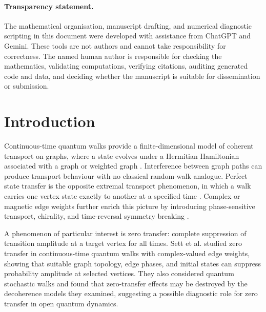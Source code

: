 \documentclass[11pt]{article}
\theoremstyle{definition}
\begin{document}
\begin{abstract}
Finally, we record finite-time perturbation bounds and a Lindblad block-preservation theorem. For open systems, exact target exclusion is preserved when the Lindblad generator leaves the supported operator block $\mathcal B_P=\{X:X=PXP\}$ invariant. The paper is a finite-dimensional formalism for exact source-target transition zeros and machine-checkable certificates; it is not a claim of intrinsic topological protection, generic robustness, physical implementation, or a new physical theory.
\end{abstract}

\paragraph{Transparency statement.}
The mathematical organisation, manuscript drafting, and numerical diagnostic scripting in this document were developed with assistance from ChatGPT and Gemini. These tools are not authors and cannot take responsibility for correctness. The named human author is responsible for checking the mathematics, validating computations, verifying citations, auditing generated code and data, and deciding whether the manuscript is suitable for dissemination or submission.

\tableofcontents
\newpage

\section{Introduction}
Continuous-time quantum walks provide a finite-dimensional model of coherent transport on graphs, where a state evolves under a Hermitian Hamiltonian associated with a graph or weighted graph \citep{FarhiGutmann1998,Childs2009,Godsil2012}. Interference between graph paths can produce transport behaviour with no classical random-walk analogue. Perfect state transfer is the opposite extremal transport phenomenon, in which a walk carries one vertex state exactly to another at a specified time \citep{Godsil2012,Coutinho2015}. Complex or magnetic edge weights further enrich this picture by introducing phase-sensitive transport, chirality, and time-reversal symmetry breaking \citep{Zimboras2013,Lu2016}.

A phenomenon of particular interest is zero transfer: complete suppression of transition amplitude at a target vertex for all times. Sett et al. \citeyearpar{Sett2019} studied zero transfer in continuous-time quantum walks with complex-valued edge weights, showing that suitable graph topology, edge phases, and initial states can suppress probability amplitude at selected vertices. They also considered quantum stochastic walks and found that zero-transfer effects may be destroyed by the decoherence models they examined, suggesting a possible diagnostic role for zero transfer in open quantum dynamics.
\end{document}
